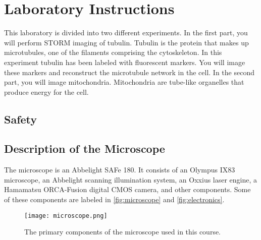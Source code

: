 \documentclass[10pt,a4paper,oneside]{book}
\begin{document}
\chapter{Laboratory Instructions}

This laboratory is divided into two different experiments. In the first part, you will perform STORM imaging of tubulin. Tubulin is the protein that makes up microtubules, one of the filaments comprising the cytoskeleton. In this experiment tubulin has been labeled with fluorescent markers. You will image these markers and reconstruct the microtubule network in the cell. In the second part, you will image mitochondria. Mitochondria are tube-like organelles that produce energy for the cell.

\section{Safety}

\newline

\noindent{}\newline

\section{Description of the Microscope}

The microscope is an Abbelight SAFe 180. It consists of an Olympus IX83 microscope, an Abbelight scanning illumination system, an Oxxius laser engine, a Hamamatsu ORCA-Fusion digital CMOS camera, and other components. Some of these components are labeled in \autoref{fig:microscope} and \autoref{fig:electronics}.

\begin{figure}[ht]
    \centering
    \texttt{[image: microscope.png]}
    \caption{The primary components of the microscope used in this course.}
    \label{fig:microscope}
\end{figure}
\end{document}
